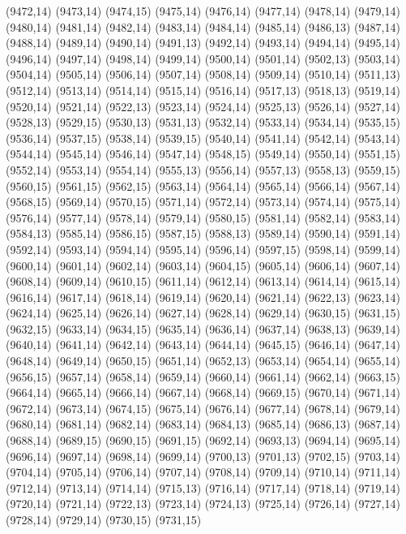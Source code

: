 (9472,14)
(9473,14)
(9474,15)
(9475,14)
(9476,14)
(9477,14)
(9478,14)
(9479,14)
(9480,14)
(9481,14)
(9482,14)
(9483,14)
(9484,14)
(9485,14)
(9486,13)
(9487,14)
(9488,14)
(9489,14)
(9490,14)
(9491,13)
(9492,14)
(9493,14)
(9494,14)
(9495,14)
(9496,14)
(9497,14)
(9498,14)
(9499,14)
(9500,14)
(9501,14)
(9502,13)
(9503,14)
(9504,14)
(9505,14)
(9506,14)
(9507,14)
(9508,14)
(9509,14)
(9510,14)
(9511,13)
(9512,14)
(9513,14)
(9514,14)
(9515,14)
(9516,14)
(9517,13)
(9518,13)
(9519,14)
(9520,14)
(9521,14)
(9522,13)
(9523,14)
(9524,14)
(9525,13)
(9526,14)
(9527,14)
(9528,13)
(9529,15)
(9530,13)
(9531,13)
(9532,14)
(9533,14)
(9534,14)
(9535,15)
(9536,14)
(9537,15)
(9538,14)
(9539,15)
(9540,14)
(9541,14)
(9542,14)
(9543,14)
(9544,14)
(9545,14)
(9546,14)
(9547,14)
(9548,15)
(9549,14)
(9550,14)
(9551,15)
(9552,14)
(9553,14)
(9554,14)
(9555,13)
(9556,14)
(9557,13)
(9558,13)
(9559,15)
(9560,15)
(9561,15)
(9562,15)
(9563,14)
(9564,14)
(9565,14)
(9566,14)
(9567,14)
(9568,15)
(9569,14)
(9570,15)
(9571,14)
(9572,14)
(9573,14)
(9574,14)
(9575,14)
(9576,14)
(9577,14)
(9578,14)
(9579,14)
(9580,15)
(9581,14)
(9582,14)
(9583,14)
(9584,13)
(9585,14)
(9586,15)
(9587,15)
(9588,13)
(9589,14)
(9590,14)
(9591,14)
(9592,14)
(9593,14)
(9594,14)
(9595,14)
(9596,14)
(9597,15)
(9598,14)
(9599,14)
(9600,14)
(9601,14)
(9602,14)
(9603,14)
(9604,15)
(9605,14)
(9606,14)
(9607,14)
(9608,14)
(9609,14)
(9610,15)
(9611,14)
(9612,14)
(9613,14)
(9614,14)
(9615,14)
(9616,14)
(9617,14)
(9618,14)
(9619,14)
(9620,14)
(9621,14)
(9622,13)
(9623,14)
(9624,14)
(9625,14)
(9626,14)
(9627,14)
(9628,14)
(9629,14)
(9630,15)
(9631,15)
(9632,15)
(9633,14)
(9634,15)
(9635,14)
(9636,14)
(9637,14)
(9638,13)
(9639,14)
(9640,14)
(9641,14)
(9642,14)
(9643,14)
(9644,14)
(9645,15)
(9646,14)
(9647,14)
(9648,14)
(9649,14)
(9650,15)
(9651,14)
(9652,13)
(9653,14)
(9654,14)
(9655,14)
(9656,15)
(9657,14)
(9658,14)
(9659,14)
(9660,14)
(9661,14)
(9662,14)
(9663,15)
(9664,14)
(9665,14)
(9666,14)
(9667,14)
(9668,14)
(9669,15)
(9670,14)
(9671,14)
(9672,14)
(9673,14)
(9674,15)
(9675,14)
(9676,14)
(9677,14)
(9678,14)
(9679,14)
(9680,14)
(9681,14)
(9682,14)
(9683,14)
(9684,13)
(9685,14)
(9686,13)
(9687,14)
(9688,14)
(9689,15)
(9690,15)
(9691,15)
(9692,14)
(9693,13)
(9694,14)
(9695,14)
(9696,14)
(9697,14)
(9698,14)
(9699,14)
(9700,13)
(9701,13)
(9702,15)
(9703,14)
(9704,14)
(9705,14)
(9706,14)
(9707,14)
(9708,14)
(9709,14)
(9710,14)
(9711,14)
(9712,14)
(9713,14)
(9714,14)
(9715,13)
(9716,14)
(9717,14)
(9718,14)
(9719,14)
(9720,14)
(9721,14)
(9722,13)
(9723,14)
(9724,13)
(9725,14)
(9726,14)
(9727,14)
(9728,14)
(9729,14)
(9730,15)
(9731,15)

